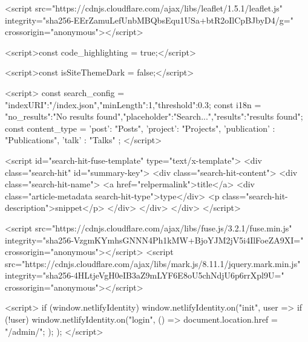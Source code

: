       <script src="https://cdnjs.cloudflare.com/ajax/libs/leaflet/1.5.1/leaflet.js" integrity="sha256-EErZamuLefUnbMBQbsEqu1USa+btR2oIlCpBJbyD4/g=" crossorigin="anonymous"></script>




    <script>const code_highlighting = true;</script>




    <script>const isSiteThemeDark = false;</script>








    <script>
      const search_config = {"indexURI":"/index.json","minLength":1,"threshold":0.3};
      const i18n = {"no_results":"No results found","placeholder":"Search...","results":"results found"};
      const content_type = {
        'post': "Posts",
        'project': "Projects",
        'publication' : "Publications",
        'talk' : "Talks"
        };
    </script>







    <script id="search-hit-fuse-template" type="text/x-template">
      <div class="search-hit" id="summary-{{key}}">
      <div class="search-hit-content">
        <div class="search-hit-name">
          <a href="{{relpermalink}}">{{title}}</a>
          <div class="article-metadata search-hit-type">{{type}}</div>
          <p class="search-hit-description">{{snippet}}</p>
        </div>
      </div>
      </div>
    </script>




    <script src="https://cdnjs.cloudflare.com/ajax/libs/fuse.js/3.2.1/fuse.min.js" integrity="sha256-VzgmKYmhsGNNN4Ph1kMW+BjoYJM2jV5i4IlFoeZA9XI=" crossorigin="anonymous"></script>
    <script src="https://cdnjs.cloudflare.com/ajax/libs/mark.js/8.11.1/jquery.mark.min.js" integrity="sha256-4HLtjeVgH0eIB3aZ9mLYF6E8oU5chNdjU6p6rrXpl9U=" crossorigin="anonymous"></script>







    <script>
      if (window.netlifyIdentity) {
        window.netlifyIdentity.on("init", user => {
          if (!user) {
            window.netlifyIdentity.on("login", () => {
              document.location.href = "/admin/";
            });
          }
        });
      }
    </script>



















